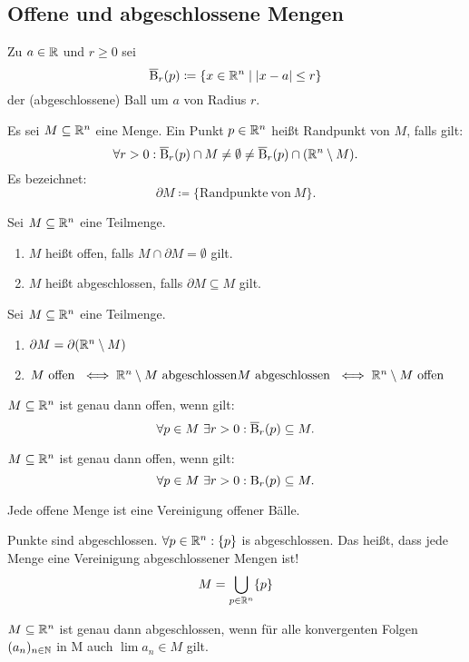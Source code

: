 \subsection{Offene und abgeschlossene Mengen}
Zu $a\in\mathbb{R}$ und $r\ge0$ sei
\[
    \operatorname{\overline{B}}_r(p) \coloneqq \{x\in\mathbb{R}^n \mid \vert x - a \vert \le r\}
\]
der (abgeschlossene) Ball um $a$ von Radius $r$.
\begin{defn}[Randpunkt]
    Es sei $M\subseteq\mathbb{R}^n$ eine Menge. Ein Punkt $p\in\mathbb{R}^n$ heißt Randpunkt von $M$, falls gilt:
    \[
        \forall r>0: \operatorname{\overline{B}}_r(p)\cap M \neq \emptyset \neq \operatorname{\overline{B}}_r(p)\cap (\mathbb{R}^n\setminus M).
    \]
    Es bezeichnet:
    \[
        \partial M \coloneqq \{\mathrm{Randpunkte\ von\ } M\}.
    \]
\end{defn}
\begin{defn} Sei $M\subseteq \mathbb{R}^n$ eine Teilmenge.
    \begin{enumerate}
        \item $M$ heißt offen, falls $M\cap \partial M = \emptyset$ gilt.
        \item $M$ heißt abgeschlossen, falls $\partial M \subseteq M$ gilt.
    \end{enumerate}
\end{defn}
\begin{lemma} Sei $M\subseteq \mathbb{R}^n$ eine Teilmenge.
    \begin{enumerate}
        \item $\partial M = \partial (\mathbb{R}^n\setminus M)$
        \item \(
                  M \mathrm{\ offen\ } \iff \mathbb{R}^n\setminus M \mathrm{\ abgeschlossen}\\
                  M \mathrm{\ abgeschlossen\ } \iff \mathbb{R}^n\setminus M \mathrm{\ offen}
        \)
    \end{enumerate}
\end{lemma}
\begin{lemma}
    $M\subseteq \mathbb{R}^n$ ist genau dann offen, wenn gilt:
    \[
        \forall p\in M\ \exists r > 0: \operatorname{\overline{B}}_r(p) \subseteq M.
    \]
\end{lemma}
\begin{lemma}
    $M\subseteq \mathbb{R}^n$ ist genau dann offen, wenn gilt:
    \[
        \forall p\in M\ \exists r > 0: \operatorname{B}_r(p) \subseteq M.
    \]
\end{lemma}
\begin{kor}
    Jede offene Menge ist eine Vereinigung offener Bälle.
\end{kor}
\begin{bem}
    \glqq Punkte sind abgeschlossen.\grqq{} \(\forall p\in\mathbb{R}^n: \{p\}\) is abgeschlossen. Das heißt, dass jede Menge eine Vereinigung abgeschlossener Mengen ist!
    \[
        M = \bigcup_{p\in\mathbb{R}^n}\{p\}
    \]
\end{bem}
\begin{lemma}
    \(M\subseteq \mathbb{R}^n\) ist genau dann abgeschlossen, wenn für alle konvergenten Folgen \((a_n)_{n\in \mathbb{N}}\) in M auch \(\lim a_n \in M\) gilt.
\end{lemma}